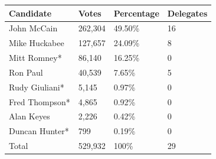 \documentclass{article}
\begin{document}
\begin{tabular}{llll}
\toprule
Candidate & Votes & Percentage & Delegates \\
\midrule
John McCain & 262,304 & 49.50\% & 16 \\
Mike Huckabee & 127,657 & 24.09\% & 8 \\
Mitt Romney* & 86,140 & 16.25\% & 0 \\
Ron Paul & 40,539 & 7.65\% & 5 \\
Rudy Giuliani* & 5,145 & 0.97\% & 0 \\
Fred Thompson* & 4,865 & 0.92\% & 0 \\
Alan Keyes & 2,226 & 0.42\% & 0 \\
Duncan Hunter* & 799 & 0.19\% & 0 \\
Total & 529,932 & 100\% & 29 \\
\bottomrule
\end{tabular}
\end{document}
